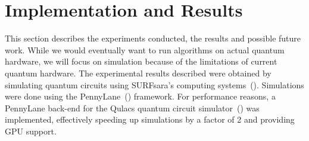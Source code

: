 \documentclass[a4paper,10pt]{article}
\begin{document}
\section{Implementation and Results} \label{sec:implementation-and-results}
This section describes the experiments conducted, the results and possible future work.
While we would eventually want to run algorithms on actual quantum hardware, we will focus on simulation because of the limitations of current quantum hardware.
The experimental results described were obtained by simulating quantum circuits using SURFsara's computing systems~(\cite{surfsara}).
Simulations were done using the PennyLane~(\cite{bergholm2018pennylane}) framework.
For performance reasons, a PennyLane back-end for the Qulacs quantum circuit simulator~(\cite{qulacs}) was implemented, effectively speeding up simulations by a factor of 2 and providing GPU support.
\end{document}
